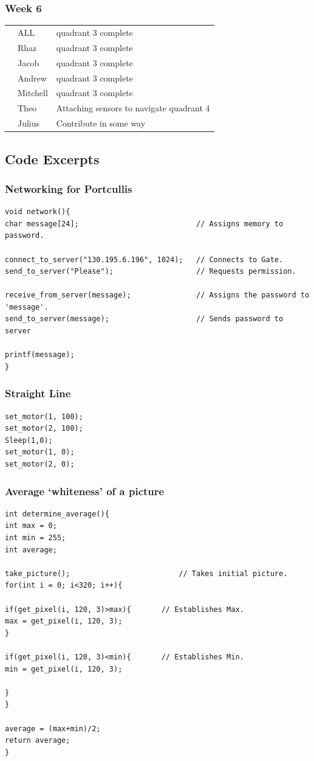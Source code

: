 \documentclass[paper=a4, fontsize=11pt]{scrartcl} %
\def\checkmark{\tikz\fill[scale=0.4] (0,.35) -- (.25,0) -- (1,.7) -- (.25,.15) -- cycle;}
\def\scalecheck{\resizebox{\widthof{\checkmark}*\ratio{\widthof{x}}{\widthof{\normalsize x}}}{!}{\checkmark}}
\numberwithin{equation}{section} %
\numberwithin{figure}{section} %
\begin{document}
\subsubsection*{Week 6}
\begin{tabularx}{\textwidth}{clX}
& ALL      & quadrant 3 complete\\
& Rhaz     & quadrant 3 complete\\
& Jacob    & quadrant 3 complete\\ 
& Andrew   & quadrant 3 complete\\ 
& Mitchell & quadrant 3 complete\\ 
\scalecheck & Theo     & Attaching sensors to navigate quadrant 4\\
& Julius   & Contribute in some way\\
\end{tabularx}

\subsection{Code Excerpts}

\subsubsection{Networking for Portcullis}
\begin{verbatim}
void network(){
char message[24];							// Assigns memory to password.

connect_to_server("130.195.6.196", 1024);	// Connects to Gate.
send_to_server("Please");					// Requests permission.

receive_from_server(message);				// Assigns the password to 'message'.
send_to_server(message);					// Sends password to server

printf(message);
}
\end{verbatim}

\subsubsection{Straight Line}
\begin{verbatim}
set_motor(1, 100);
set_motor(2, 100);
Sleep(1,0);
set_motor(1, 0);
set_motor(2, 0);
\end{verbatim}

\subsubsection{Average `whiteness' of a picture}
\begin{verbatim}
int determine_average(){
int max = 0;
int min = 255;
int average;

take_picture();							// Takes initial picture.
for(int i = 0; i<320; i++){

if(get_pixel(i, 120, 3)>max){		// Establishes Max.
max = get_pixel(i, 120, 3);
}

if(get_pixel(i, 120, 3)<min){		// Establishes Min.
min = get_pixel(i, 120, 3);

}
}

average = (max+min)/2;
return average;
}
\end{verbatim}
\end{document}
